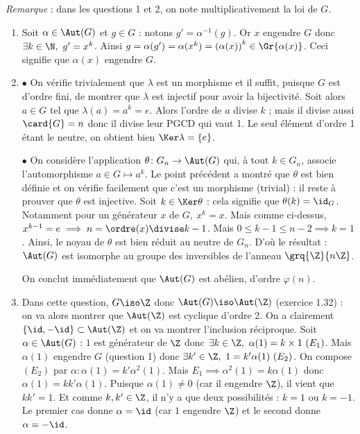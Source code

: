 \textit{Remarque} : dans les questions 1 et 2, on note multiplicativement la loi de $G$.

\begin{enumerate}
 \item Soit $\alpha \in \Aut(G)$ et $g\in G$ : notons $g'=\alpha^{-1}(g)$. Or $x$ engendre $G$ donc $\exists k\in \N,~ g'= x^k$. Ainsi $g = \alpha(g') = \alpha(x^k) = \left(\alpha(x)\right)^k \in \Gr{\alpha(x)}$. Ceci signifie que $\alpha(x)$ engendre $G$.
 \item $\bullet$ On vérifie trivialement que $\lambda$ est un morphisme et il suffit, puisque $G$ est d'ordre fini, de montrer que $\lambda$ est injectif pour avoir la bijectivité. Soit alors $a\in G$ tel que $\lambda(a) = a^k = e$. Alors l'ordre de $a$ divise $k$ ; mais il divise aussi $\card{G} = n$ donc il divise leur PGCD qui vaut 1. Le seul élément d'ordre 1 étant le neutre, on obtient bien $\Ker \lambda = \{e\}$.

 $\bullet$ On considère l'application $\theta \colon G_n\to \Aut(G)$ qui, à tout $k\in G_n$, associe l'automorphisme $a\in G\mapsto a^k$. 
 Le point précédent a montré que $\theta$ est bien définie et on vérifie facilement que c'est un morphisme (trivial) : 
 il reste à prouver que $\theta$ est injective. Soit $k\in \Ker \theta$ : cela signifie que $\theta(k)= \id_G$. 
 Notamment pour un générateur $x$ de $G,~ x^k = x$. Mais comme ci-dessus, $x^{k-1} = e\implies n=\ordre(x)  \divise k-1$. 
 Mais $0\leqslant k-1\leqslant n-2\implies k=1$. Ainsi, le noyau de $\theta$ est bien réduit au neutre de $G_n$. D'où le résultat : $\Aut(G)$ est isomorphe au groupe des inversibles de l'anneau $\grq{\Z}{n\Z}$.

 On conclut immédiatement que $\Aut(G)$ est abélien, d'ordre $\varphi(n)$.

 \item Dans cette question, $G \iso \Z$ donc $\Aut(G)\iso \Aut(\Z)$ (exercice 1.32) : on va alors montrer que $\Aut(\Z)$ est cyclique d'ordre 2. On a clairement $\{\id, -\id \}\subset \Aut(\Z)$ et on va montrer l'inclusion réciproque. Soit $\alpha \in \Aut(G)$ : $1$ est générateur de $\Z$ donc $\exists k\in \Z,~ \alpha(1) = k\times 1~ (E_1)$. Mais $\alpha(1)$ engendre $G$ (question 1) donc $\exists k' \in \Z,~ 1 = k'\alpha(1)~ (E_2)$. On compose $(E_2)$ par $\alpha : \alpha(1) = k' \alpha^2(1)$. Mais $E_1\implies \alpha^2(1) = k\alpha(1)$ donc $\alpha(1) = kk' \alpha(1)$. Puisque $\alpha(1)\neq 0$ (car il engendre $\Z$), il vient que $kk' = 1$. Et comme $k,k'\in \Z$, il n'y a que deux possibilités : $k =1$ ou $k=-1$. Le premier cas donne $\alpha = \id$ (car $1$ engendre $\Z$) et le second donne $\alpha = -\id$.


\end{enumerate}
